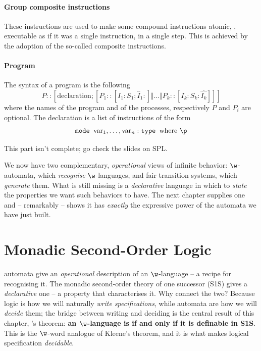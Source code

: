 \documentclass[oneside]{academica}
\begin{document}
\subsubsection{Group composite instructions}

These instructions are used to make some compound instructions atomic, \ie, executable as if it was a single instruction, in a single step. This is achieved by the adoption of the so-called composite instructions.

\subsubsection{Program}

The syntax of a program is the following
\begin{equation*}
  P :: [ \text{declaration}; [P_1 :: [I_1 : S_1; \widehat{I}_1 : ] \Vert \ldots \Vert P_k :: [I_k : S_k : \hat{I_k} ]]]
\end{equation*}
where the names of the program and of the processes, respectively $P$ and $P_i$ are optional.
The declaration is a list of instructions of the form
\begin{equation*}
  \texttt{mode } \text{var}_1, \ldots, \text{var}_n : \texttt{type } \text{where } \p
\end{equation*}

\begin{note}
  This part isn't complete; go check the slides on SPL.
\end{note}

\bigskip
We now have two complementary, \emph{operational} views of infinite behavior: $\w$-automata, which \emph{recognise} $\w$-languages, and fair transition systems, which \emph{generate} them. What is still missing is a \emph{declarative} language in which to \emph{state} the properties we want such behaviors to have. The next chapter supplies one and -- remarkably -- shows it has \emph{exactly} the expressive power of the automata we have just built.

\chapter{Monadic Second-Order Logic}

\Buchi automata give an \emph{operational} description of an $\w$-language -- a recipe for recognising it. The monadic second-order theory of one successor (S1S) gives a \emph{declarative} one -- a property that characterises it. Why connect the two? Because logic is how we will naturally \emph{write specifications}, while automata are how we will \emph{decide} them; the bridge between writing and deciding is the central result of this chapter, \Buchi's theorem: \textbf{an $\w$-language is \wreg if and only if it is definable in S1S}. This is the $\w$-word analogue of Kleene's theorem, and it is what makes logical specification \emph{decidable}.
\end{document}
